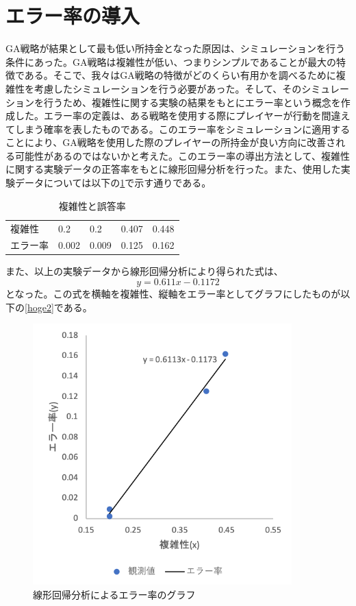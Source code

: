 \section{エラー率の導入}
GA戦略が結果として最も低い所持金となった原因は、シミュレーションを行う条件にあった。GA戦略は複雑性が低い、つまりシンプルであることが最大の特徴である。そこで、我々はGA戦略の特徴がどのくらい有用かを調べるために複雑性を考慮したシミュレーションを行う必要があった。そして、そのシミュレーションを行うため、複雑性に関する実験の結果をもとにエラー率という概念を作成した。エラー率の定義は、ある戦略を使用する際にプレイヤーが行動を間違えてしまう確率を表したものである。このエラー率をシミュレーションに適用することにより、GA戦略を使用した際のプレイヤーの所持金が良い方向に改善される可能性があるのではないかと考えた。このエラー率の導出方法として、複雑性に関する実験データの正答率をもとに線形回帰分析を行った。また、使用した実験データについては以下の\ref{hoge}で示す通りである。
\begin{table}[H]
\begin{tabular}{lllll}
複雑性&0.2&0.2&0.407&0.448 \\
エラー率&0.002&0.009&0.125&0.162 \\ 
\end{tabular}
\caption{複雑性と誤答率}
\label{hoge}
\end{table}
また、以上の実験データから線形回帰分析により得られた式は、
\begin{equation}
y=0.611x - 0.1172
\end{equation}
となった。この式を横軸を複雑性、縦軸をエラー率としてグラフにしたものが以下の\ref{hoge2}である。
\begin{figure}[H]
\begin{center}
\includegraphics[width=10cm]{figure/error_rate.png}
\caption{線形回帰分析によるエラー率のグラフ}
\end{center}
\end{figure}

